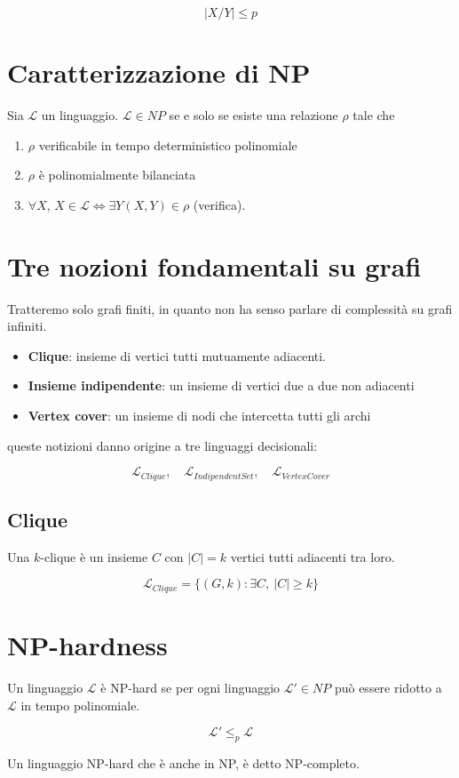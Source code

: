 $$
|X/Y| \leq p
$$

\section{Caratterizzazione di NP}
Sia $\mathcal L$ un linguaggio. $\mathcal L \in NP$ se e solo se esiste una relazione $\rho$ tale che
\begin{enumerate}
	\item $\rho$ verificabile in tempo deterministico polinomiale
	\item $\rho$ è polinomialmente bilanciata
	\item $\forall X$, $X \in \mathcal L \Leftrightarrow \exists Y (X,Y) \in \rho$ (verifica).
\end{enumerate}

\newpage
\section{Tre nozioni fondamentali su grafi}
Tratteremo solo grafi finiti, in quanto non ha senso parlare di complessità su grafi infiniti.
\begin{itemize}
	\item \textbf{Clique}: insieme di vertici tutti mutuamente adiacenti. 
	\item \textbf{Insieme indipendente}: un insieme di vertici due a due non adiacenti
	\item \textbf{Vertex cover}: un insieme di nodi che intercetta tutti gli archi
\end{itemize}
%
queste notizioni danno origine a tre linguaggi decisionali:

$$
\mathcal{L}_{\textit{Clique}},\quad
\mathcal{L}_{\textit{IndipendentSet}},\quad 
\mathcal{L}_{\textit{VertexCover}}
$$

\subsection{Clique}
Una $k$-clique è un insieme $C$ con $|C| = k$ vertici tutti adiacenti tra loro. 

$$
\mathcal{L}_{\textit{Clique}} = \{(G, k) : \exists C, \ |C| \geq k\}
$$

\section{NP-hardness}
Un linguaggio $\mathcal L$ è NP-hard se per ogni linguaggio $\mathcal L' \in NP$ può essere ridotto a $\mathcal L$ in tempo polinomiale.

$$
\mathcal L' \leq_p \mathcal L
$$

Un linguaggio NP-hard che è anche in NP, è detto NP-completo.

